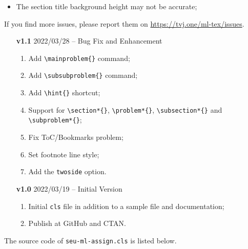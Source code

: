 \documentclass[twoside]{seu-ml-assign}
\renewcommand{\sectionheadname}{Section}
\begin{document}
  \appendix
  \renewcommand{\sectionheadname}{Appendix}

  \label{sec:known_issues}

    \begin{itemize}
      \item The section title background height may not be accurate;
    \end{itemize}

    If you find more issues, please report them on \url{https://tvj.one/ml-tex/issues}.


    \begin{multicols}{2}
      \begin{itemize}
        \item [\textbf{v1.1}] 2022/03/28 -- Bug Fix and Enhancement
          \begin{enumerate}
            \item Add \verb|\mainproblem{}| command;
            \item Add \verb|\subsubproblem{}| command;
            \item Add \verb|\hint{}| shortcut;
            \item Support for \verb|\section*{}|, \verb|\problem*{}|, \verb|\subsection*{}| and \verb|\subproblem*{}|;
            \item Fix ToC/Bookmarks problem;
            \item Set footnote line style;
            \item Add the \texttt{twoside} option.
          \end{enumerate}
        \item [\textbf{v1.0}] 2022/03/19 -- Initial Version
          \begin{enumerate}
            \item Initial \texttt{cls} file in addition to a sample file and documentation;
            \item Publish at GitHub and CTAN.
          \end{enumerate}
      \end{itemize}
    \end{multicols}


    The source code of \texttt{seu-ml-assign.cls} is listed below.

    
\end{document}
